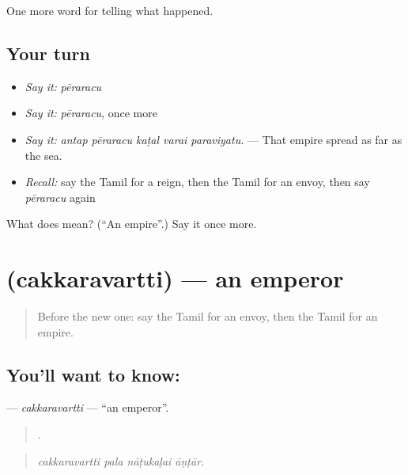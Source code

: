 \begin{grammarlens}[title={What you've built}]
One more word for telling what happened.
\end{grammarlens}

\subsection*{Your turn}
\begin{itemize}
\raggedright
  \item \emph{Say it:} \emph{pēraracu}
  \item \emph{Say it:} \emph{pēraracu}, once more
  \item \emph{Say it:} \emph{antap pēraracu kaṭal varai paraviyatu.} — That empire spread as far as the sea.
  \item \emph{Recall:} say the Tamil for a reign, then the Tamil for an envoy, then say \emph{pēraracu} again
\end{itemize}

\begin{tcolorbox}[breakable,colback=teal!4,colframe=teal!35!black,title={Before you move on}]
What does  mean? (\textquotedblleft{}An empire\textquotedblright{}.) Say it once more.
\end{tcolorbox}
\section[\texorpdfstring{\ta{சக்கரவர்த்தி} (cakkaravartti)}{சக்கரவர்த்தி (cakkaravartti)}]{ (cakkaravartti) — an emperor}

\label{lesson:TA-C330-cakkaravartti}



\begin{quote}
Before the new one: say the Tamil for an envoy, then the Tamil for an empire.
\end{quote}

\subsection*{You'll want to know: }
\textbf{} — \emph{cakkaravartti} — \textquotedblleft{}an emperor\textquotedblright{}.

\begin{quote}
   .
\end{quote}

\begin{quote}
\emph{cakkaravartti pala nāṭukaḷai āṇṭār.}
\end{quote}

